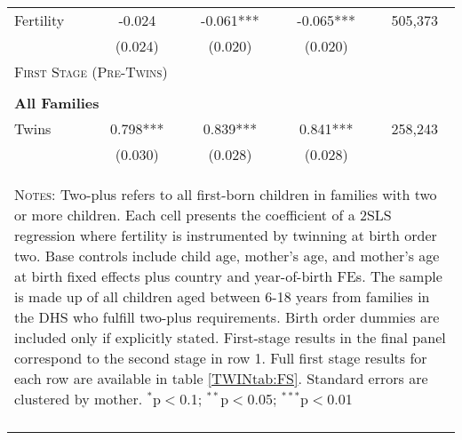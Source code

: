 \begin{table}[!htbp]
\begin{tabular}{lcccc}
Fertility&-0.024&-0.061***&-0.065***&505,373\\
         &(0.024)&(0.020)&(0.020)&\\
\midrule\multicolumn{5}{l}{\textsc{First Stage (Pre-Twins)}}\\ 
&&&&\\
\multicolumn{5}{l}{\textbf{All Families}}\\ 
Twins&0.798***&0.839***&0.841***&258,243\\
         &(0.030)&(0.028)&(0.028)&\\
\hline\multicolumn{5}{p{10cm}}{\begin{footnotesize}\textsc{Notes:} Two-plus refers to all first-born children in families with two or more children.  Each cell presents the coefficient of a 2SLS regression where fertility is instrumented by twinning at birth order two.  Base controls include child age, mother's age, and mother's age at birth fixed effects plus country and year-of-birth FEs.  The sample is made up of all children aged between 6-18 years from families in the DHS who fulfill two-plus requirements. Birth order dummies are included only if explicitly stated.  First-stage results in the final panel correspond to the second stage in row 1.  Full first stage results for each row are available in table \ref{TWINtab:FS}. Standard errors are clustered by mother. 
$^{*}$p$<$0.1; $^{**}$p$<$0.05; $^{***}$p$<$0.01\end{footnotesize}}
\\\bottomrule\normalsize\end{tabular}\end{table} 
